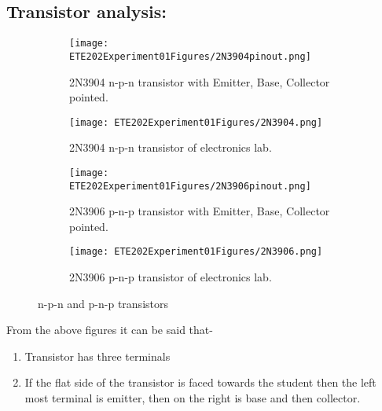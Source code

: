 \documentclass[a4paper, 14pt]{extarticle}
\begin{document}
        \subsection{Transistor analysis:}
        \vspace{20pt}
            \begin{figure}[h]
                \centering
                \begin{subfigure}[h]{0.4\textwidth} %
                    \texttt{[image: ETE202Experiment01Figures/2N3904pinout.png]}
                    \caption{2N3904 n-p-n transistor with Emitter, Base, Collector pointed.}
                    \label{fig:subfig1}
                \end{subfigure}
                \hfill
                \begin{subfigure}[h]{0.4\textwidth} %
                \centering
                    \texttt{[image: ETE202Experiment01Figures/2N3904.png]}
                    \caption{2N3904 n-p-n transistor of electronics lab.}
                    \label{fig:subfig2}
                \end{subfigure}
                \vspace{20pt} 
                \begin{subfigure}[h]{0.4\textwidth} %
                    \texttt{[image: ETE202Experiment01Figures/2N3906pinout.png]}
                    \caption{2N3906 p-n-p transistor with Emitter, Base, Collector pointed.}
                    \label{fig:subfig3}
                \end{subfigure}
                \hfill
                \begin{subfigure}[h]{0.4\textwidth} %
                    \texttt{[image: ETE202Experiment01Figures/2N3906.png]}
                    \caption{2N3906 p-n-p transistor of electronics lab.}
                    \label{fig:subfig4}
                \end{subfigure}
                \vspace{10pt}
                \caption{n-p-n and p-n-p transistors}
                \label{mainfig1}
            \end{figure}
            From the above figures it can be said that-
            \begin{enumerate}
                \item Transistor has three terminals
                \item If the flat side of the transistor is faced towards the student then the left most terminal is emitter, then on the right is base and then collector.
            \end{enumerate}
            
\end{document}
